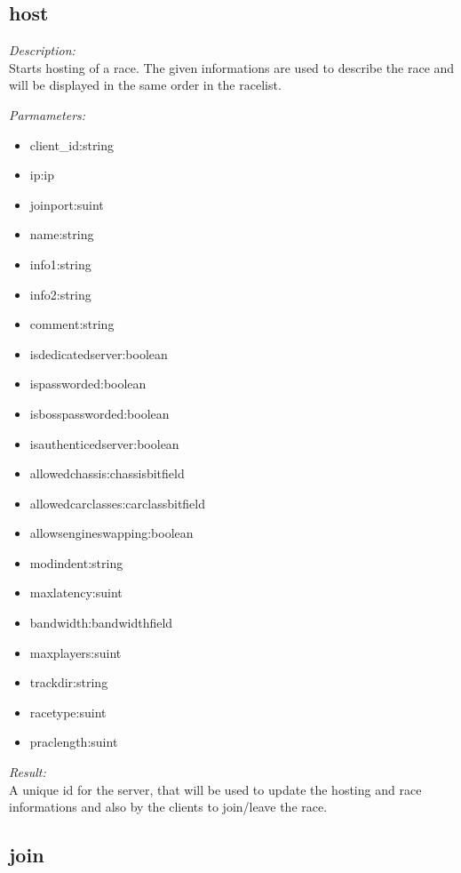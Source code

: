 \subsection{host}

\begin{description}
\item {\it Description:}\\
Starts hosting of a race. The given informations are used to describe the race and will be displayed in the same order in the racelist.
\item {\it Parmameters:}
\begin{itemize}
\item client\_id:string
\item ip:ip
\item joinport:suint
\item name:string
\item info1:string
\item info2:string
\item comment:string
\item isdedicatedserver:boolean
\item ispassworded:boolean
\item isbosspassworded:boolean
\item isauthenticedserver:boolean
\item allowedchassis:chassisbitfield
\item allowedcarclasses:carclassbitfield
\item allowsengineswapping:boolean
\item modindent:string
\item maxlatency:suint
\item bandwidth:bandwidthfield
\item maxplayers:suint
\item trackdir:string
\item racetype:suint
\item praclength:suint
\end{itemize}
\item {\it Result:}\\
A unique id for the server, that will be used to update the hosting and race informations and also by the clients to join/leave the race.
\end{description}

\subsection{join}

